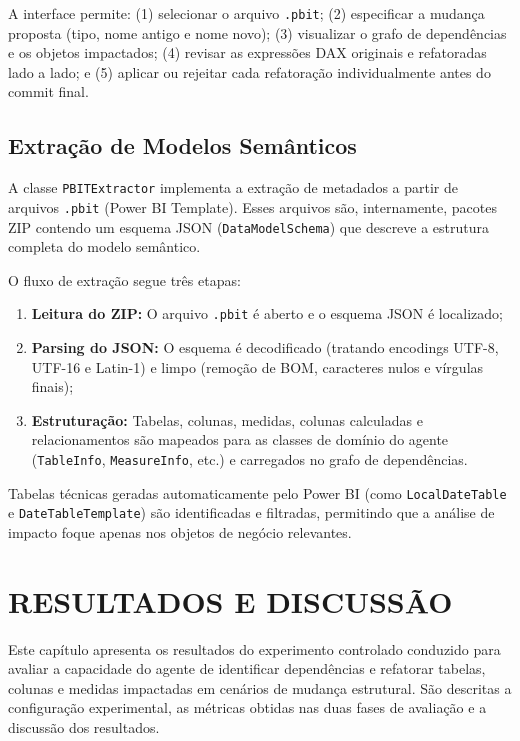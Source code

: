 \documentclass[
    12pt,               %
    openright,          %
    oneside,            %
    a4paper,            %
    chapter=TITLE,      %
    section=TITLE,      %
    brazil              %
]{abntex2}
\begin{document}
A interface permite: (1) selecionar o arquivo \texttt{.pbit}; (2) especificar a mudança proposta (tipo, nome antigo e nome novo); (3) visualizar o grafo de dependências e os objetos impactados; (4) revisar as expressões DAX originais e refatoradas lado a lado; e (5) aplicar ou rejeitar cada refatoração individualmente antes do commit final.

\section{Extração de Modelos Semânticos}

A classe \texttt{PBITExtractor} implementa a extração de metadados a partir de arquivos \texttt{.pbit} (Power BI Template). Esses arquivos são, internamente, pacotes ZIP contendo um esquema JSON (\texttt{DataModelSchema}) que descreve a estrutura completa do modelo semântico.

O fluxo de extração segue três etapas:

\begin{enumerate}
    \item \textbf{Leitura do ZIP:} O arquivo \texttt{.pbit} é aberto e o esquema JSON é localizado;
    \item \textbf{Parsing do JSON:} O esquema é decodificado (tratando encodings UTF-8, UTF-16 e Latin-1) e limpo (remoção de BOM, caracteres nulos e vírgulas finais);
    \item \textbf{Estruturação:} Tabelas, colunas, medidas, colunas calculadas e relacionamentos são mapeados para as classes de domínio do agente (\texttt{TableInfo}, \texttt{MeasureInfo}, etc.) e carregados no grafo de dependências.
\end{enumerate}

Tabelas técnicas geradas automaticamente pelo Power BI (como \texttt{LocalDateTable} e \texttt{DateTableTemplate}) são identificadas e filtradas, permitindo que a análise de impacto foque apenas nos objetos de negócio relevantes.

\chapter{RESULTADOS E DISCUSSÃO}

Este capítulo apresenta os resultados do experimento controlado conduzido para avaliar a capacidade do agente de identificar dependências e refatorar tabelas, colunas e medidas impactadas em cenários de mudança estrutural. São descritas a configuração experimental, as métricas obtidas nas duas fases de avaliação e a discussão dos resultados.
\end{document}
